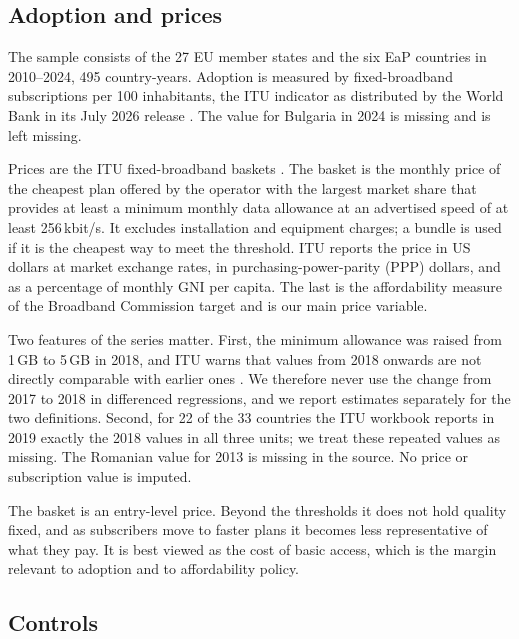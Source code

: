 \documentclass[pdflatex,sn-basic]{sn-jnl}
\begin{document}
\subsection{Adoption and prices}

The sample consists of the 27 EU member states and the six EaP countries in 2010--2024, 495 country-years. Adoption is measured by fixed-broadband subscriptions per 100 inhabitants, the ITU indicator as distributed by the World Bank in its July 2026 release \citep{worldbank2026wdi}. The value for Bulgaria in 2024 is missing and is left missing.

Prices are the ITU fixed-broadband baskets \citep{itu2025baskets,itu2020measuring}. The basket is the monthly price of the cheapest plan offered by the operator with the largest market share that provides at least a minimum monthly data allowance at an advertised speed of at least 256\,kbit/s. It excludes installation and equipment charges; a bundle is used if it is the cheapest way to meet the threshold. ITU reports the price in US dollars at market exchange rates, in purchasing-power-parity (PPP) dollars, and as a percentage of monthly GNI per capita. The last is the affordability measure of the Broadband Commission target and is our main price variable.

Two features of the series matter. First, the minimum allowance was raised from 1\,GB to 5\,GB in 2018, and ITU warns that values from 2018 onwards are not directly comparable with earlier ones \citep{itu2020measuring}. We therefore never use the change from 2017 to 2018 in differenced regressions, and we report estimates separately for the two definitions. Second, for 22 of the 33 countries the ITU workbook reports in 2019 exactly the 2018 values in all three units; we treat these repeated values as missing. The Romanian value for 2013 is missing in the source. No price or subscription value is imputed.

The basket is an entry-level price. Beyond the thresholds it does not hold quality fixed, and as subscribers move to faster plans it becomes less representative of what they pay. It is best viewed as the cost of basic access, which is the margin relevant to adoption and to affordability policy.

\subsection{Controls}
\end{document}
